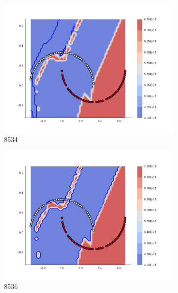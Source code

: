 \begin{figure}[h]
\begin{subfigure}[b]{0.09\textwidth}
    \includegraphics[clip, trim=2.35cm 1.75cm 4.5cm 0cm,width=\textwidth]{img/convergence/8534.pdf}
    \caption{8534}
    \label{fig:convergence_8534}
\end{subfigure}
%
\begin{subfigure}[b]{0.09\textwidth}
    \includegraphics[clip, trim=2.35cm 1.75cm 4.5cm 0cm,width=\textwidth]{img/convergence/8536.pdf}
    \caption{8536}
    \label{fig:convergence_8536}
\end{subfigure}
%
\begin{subfigure}[b]{0.09\textwidth}

\end{subfigure}
\end{figure}
